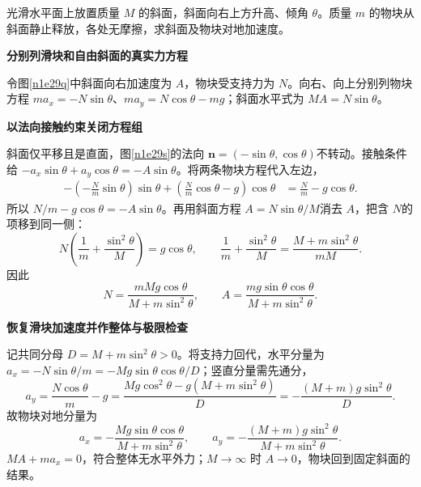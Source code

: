 \begin{question}\begin{example}[自由斜面的反冲加速度]\label{n1e29}
光滑水平面上放置质量 $M$ 的斜面，斜面向右上方升高、倾角 $\theta$。质量 $m$ 的物块从斜面静止释放，各处无摩擦，求斜面及物块对地加速度。
\end{example}\end{question}
\begin{solution}\textbf{分别列滑块和自由斜面的真实力方程}\par\nobreak
令图\ref{n1e29q}中斜面向右加速度为 $A$，物块受支持力为 $N$。向右、向上分别列物块方程 $ma_x=-N\sin\theta$、$ma_y=N\cos\theta-mg$；斜面水平式为 $MA=N\sin\theta$。



\par\medskip{}\noindent\textbf{以法向接触约束关闭方程组}\par\nobreak
斜面仅平移且是直面，图\ref{n1e29s}的法向 $\bm n=(-\sin\theta,\cos\theta)$不转动。接触条件给 $-a_x\sin\theta+a_y\cos\theta=-A\sin\theta$。将两条物块方程代入左边，
\begin{align*}
 -\left(-\frac Nm\sin\theta\right)\sin\theta
 +\left(\frac Nm\cos\theta-g\right)\cos\theta
 &=\frac Nm-g\cos\theta.
\end{align*}
所以 $N/m-g\cos\theta=-A\sin\theta$。再用斜面方程 $A=N\sin\theta/M$消去 $A$，把含 $N$的项移到同一侧：
\[
 N\left(\frac1m+\frac{\sin^2\theta}{M}\right)=g\cos\theta,
 \qquad
 \frac1m+\frac{\sin^2\theta}{M}
 =\frac{M+m\sin^2\theta}{mM}.
\]
因此
\[
 N=\frac{mMg\cos\theta}{M+m\sin^2\theta},\qquad
 A=\frac{mg\sin\theta\cos\theta}{M+m\sin^2\theta}.
\]


\par\medskip{}\noindent\textbf{恢复滑块加速度并作整体与极限检查}\par\nobreak
记共同分母 $D=M+m\sin^2\theta>0$。将支持力回代，水平分量为 $a_x=-N\sin\theta/m=-Mg\sin\theta\cos\theta/D$；竖直分量需先通分，
\[
 a_y=\frac{N\cos\theta}{m}-g
 =\frac{Mg\cos^2\theta-g(M+m\sin^2\theta)}{D}
 =-\frac{(M+m)g\sin^2\theta}{D}.
\]
故物块对地分量为
\[
 a_x=-\frac{Mg\sin\theta\cos\theta}{M+m\sin^2\theta},\qquad
 a_y=-\frac{(M+m)g\sin^2\theta}{M+m\sin^2\theta}.
\]
$MA+ma_x=0$，符合整体无水平外力；$M\to\infty$ 时 $A\to0$，物块回到固定斜面的结果。
\end{solution}

